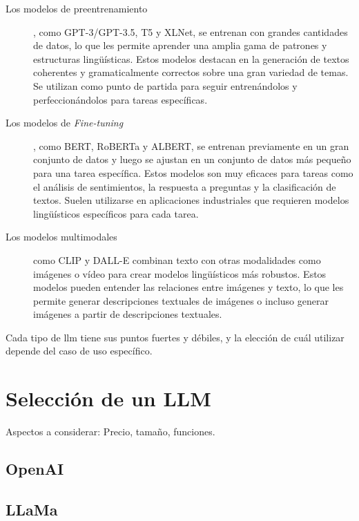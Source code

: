\begin{description}

\item[Los modelos de preentrenamiento], como GPT-3/GPT-3.5, T5 y XLNet, se entrenan con grandes cantidades de datos, lo que les permite aprender una amplia gama de patrones y estructuras lingüísticas. Estos modelos destacan en la generación de textos coherentes y gramaticalmente correctos sobre una gran variedad de temas. Se utilizan como punto de partida para seguir entrenándolos y perfeccionándolos para tareas específicas.

\item[Los modelos de \textit{Fine-tuning}], como BERT, RoBERTa y ALBERT, se entrenan previamente en un gran conjunto de datos y luego se ajustan en un conjunto de datos más pequeño para una tarea específica. Estos modelos son muy eficaces para tareas como el análisis de sentimientos, la respuesta a preguntas y la clasificación de textos. Suelen utilizarse en aplicaciones industriales que requieren modelos lingüísticos específicos para cada tarea.

\item[Los modelos multimodales] como CLIP y DALL-E combinan texto con otras modalidades como imágenes o vídeo para crear modelos lingüísticos más robustos. Estos modelos pueden entender las relaciones entre imágenes y texto, lo que les permite generar descripciones textuales de imágenes o incluso generar imágenes a partir de descripciones textuales.

\end{description}

Cada tipo de \acrshort{llm} tiene sus puntos fuertes y débiles, y la elección de cuál utilizar depende del caso de uso específico.


\section{Selección de un LLM}

Aspectos a considerar: Precio, tamaño, funciones.

\subsection{OpenAI}


\subsection{LLaMa}

